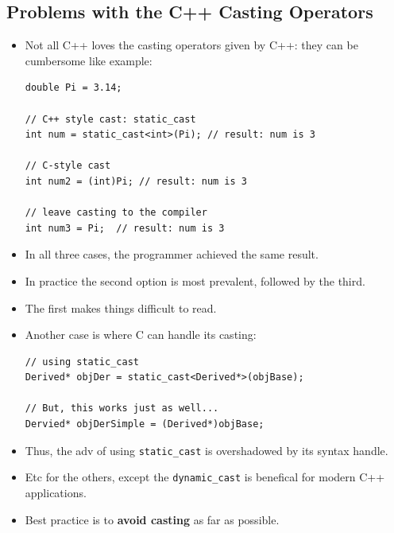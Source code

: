 \documentclass[10pt]{article}
\newcommand{\pbreak}{\vspace{30pt}}
\begin{document}
\subsection{Problems with the C++ Casting Operators}
\begin{itemize}
	\item Not all C++ loves the casting operators given by C++: they can be cumbersome like example:

	\begin{verbatim}
double Pi = 3.14;

// C++ style cast: static_cast
int num = static_cast<int>(Pi);	// result: num is 3

// C-style cast
int num2 = (int)Pi;	// result: num is 3

// leave casting to the compiler
int num3 = Pi;	// result: num is 3
	\end{verbatim}

\item In all three cases, the programmer achieved the same result.

\item In practice the second option is most prevalent, followed by the third.

\item The first makes things difficult to read.

\pbreak

\item Another case is where C can handle its casting:

\begin{verbatim}
// using static_cast
Derived* objDer = static_cast<Derived*>(objBase);

// But, this works just as well...
Dervied* objDerSimple = (Derived*)objBase;
\end{verbatim}

\item Thus, the adv of using \verb|static_cast| is overshadowed by its syntax handle.

\item Etc for the others, except the \verb|dynamic_cast| is benefical for modern C++ applications.

\item Best practice is to \textbf{avoid casting} as far as possible.
\end{itemize}

\newpage
\end{document}
